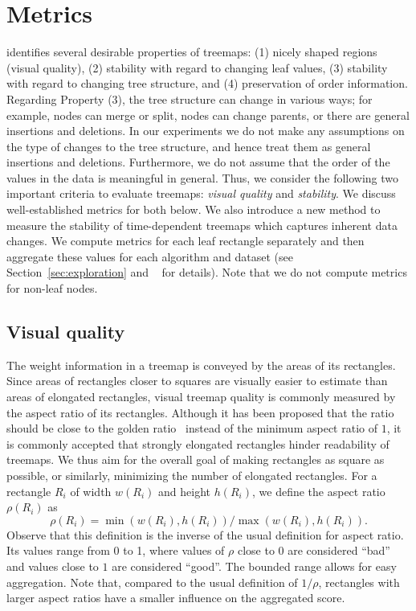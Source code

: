 \section{Metrics}
\label{sec:metrics-2}
\cite{jigsaw} identifies several desirable properties of treemaps: (1) nicely shaped regions (visual quality), (2) stability with regard to changing leaf values, (3) stability with regard to changing tree structure, and (4) preservation of order information. Regarding Property (3), the tree structure can change in various ways; for example, nodes can merge or split, nodes can change parents, or there are general insertions and deletions. In our experiments we do not make any assumptions on the type of changes to the tree structure, and hence treat them as general insertions and deletions. Furthermore, we do not assume that the order of the values in the data is meaningful in general. Thus, we consider the following two important criteria to evaluate treemaps: \emph{visual quality} and \emph{stability}. We discuss well-established metrics for both below. We also introduce a new method to measure the stability of time-dependent treemaps which captures inherent data changes. We compute metrics for each leaf rectangle separately and then aggregate these values for each algorithm and dataset (see Section~\ref{sec:exploration} and ~\citep{URLTreemaps} for details). Note that we do not compute metrics for non-leaf nodes. 

\subsection{Visual quality}
\label{sec:aspectratio}
The weight information in a treemap is conveyed by the areas of its rectangles. Since areas of rectangles closer to squares are visually easier to estimate than areas of elongated rectangles, visual treemap quality is commonly measured by the aspect ratio of its rectangles. Although it has been proposed that the ratio should be close to the golden ratio~\citep{lu2017golden} instead of the minimum aspect ratio of $1$, it is commonly accepted that strongly elongated rectangles hinder readability of treemaps. We thus aim for the overall goal of making rectangles as square as possible, or similarly, minimizing the number of elongated rectangles. For a rectangle $R_i$ of width $w(R_i)$ and height $h(R_i)$, we define the aspect ratio $\rho(R_i)$ as
%
\begin{equation}
\rho(R_i) = \min(w(R_i), h(R_i)) / \max(w(R_i), h(R_i)).
\label{eqn:rho}
\end{equation}
%
Observe that this definition is the inverse of the usual definition for aspect ratio. Its values range from 0 to 1, where values of $\rho$ close to $0$ are considered ``bad'' and values close to $1$ are considered ``good''. The bounded range allows for easy aggregation. Note that, compared to the usual definition of $1/\rho$, rectangles with larger aspect ratios have a smaller influence on the aggregated score.

